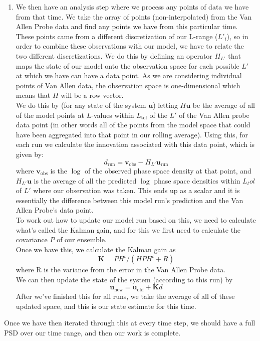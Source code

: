 \documentclass[a4paper, fleqn]{article}
\begin{document}
\begin{enumerate}
\begin{enumerate}
	    \item We then have an analysis step where we process any points of data we have from that time. We take the array of points (non-interpolated) from the Van Allen Probe data and find any points we have from this particular time. These points came from a different discretization of our L-range ($L'_i$), so in order to combine these observations with our model, we have to relate the two different discretizations. We do this by defining an operator $H_{L'}$ that maps the state of our model onto the observation space for each possible $L'$ at which we have can have a data point. As we are considering individual points of Van Allen data, the observation space is one-dimensional which means that $H$ will be a row vector.\\
    We do this by (for any state of the system $\mathbf{u}$) letting $H\mathbf{u}$ be the average of all of the model points at $L$-values within $L_{\text{tol}}$ of the $L'$ of the Van Allen probe data point (in other words all of the points from the model space that could have been aggregated into that point in our rolling average).
    Using this, for each run we calculate the innovation associated with this data point, which is given by:
        \[d_{\text{run}} = \mathbf{v}_{\text{obs}} - H_{L'} \mathbf{u}_{\text{run}}\]
    where $\mathbf{v}_{\text{obs}}$ is the $\log$ of the observed phase space density at that point,  and $H_{L'} \mathbf{u}$ is the average of all the predicted $\log$ phase space densities within $L_tol$ of $L'$ where our observation was taken. This ends up as a scalar and it is essentially the difference between this model run's prediction and the Van Allen Probe's data point.\\
    To work out how to update our model run based on this, we need to calculate what's called the Kalman gain, and for this we first need to calculate the covariance $P$ of our ensemble.\\
    Once we have this, we calculate the Kalman gain as
    \[\mathbf{K}=PH^t/(HPH^t+R)\]
    where R is the variance from the error in the Van Allen Probe data.\\
    We can then update the state of the system  (according to this run) by
    \[\mathbf{u}_{\text{new}} = \mathbf{u}_{\text{old}} +\mathbf{K} d\]
    After we've finished this for all runs, we take the average of all of these updated space, and this is our state estimate for this time.
    \end{enumerate}
\end{enumerate}
Once we have then iterated through this at every time step, we should have a full PSD over our time range, and then our work is complete.
\end{document}

